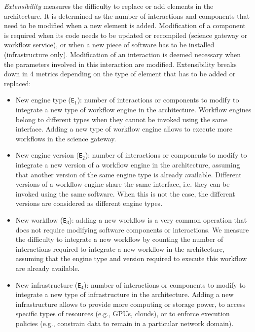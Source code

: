 \documentclass[preprint,3p,twocolumn]{elsarticle}
\newcommand{\todo}[2]{\pdfmargincomment[color=red,author=#1,open=true]{#2}}
\begin{document}
\emph{Extensibility} measures the difficulty to replace or add
elements in the architecture. It is determined as the number of
interactions and components that need to be modified when a new
element is added. Modification of a component is required when its
code needs to be updated or recompiled (science gateway or workflow
service), or when a new piece of software has to be installed
(infrastructure only). Modification of an interaction is deemed
necessary when the parameters involved in this interaction are
modified.  Extensibility breaks down in 4 metrics depending on the
type of element that has to be added or replaced:
\begin{itemize}[leftmargin=0cm,itemindent=0.35cm,itemsep=0cm]
\item New engine type (\texttt{E$_1$}): number of interactions or
  components to modify to integrate a new type of workflow engine in
  the architecture. Workflow engines belong to different types when
  they cannot be invoked using the same interface. Adding a new type
  of workflow engine allows to execute more workflows in the science
  gateway.
\item New engine version (\texttt{E$_2$}): number of interactions or
  components to modify to integrate a new version of a workflow engine
  in the architecture, assuming that another version of the same
  engine type is already available. Different versions of a workflow
  engine share the same interface, i.e. they can be invoked using the
  same software. When this is not the case, the different versions are
  considered as different engine types.
\item New workflow (\texttt{E$_3$}): adding a new workflow is a very
  common operation that does not require modifying software components
  or interactions. We measure the difficulty to integrate a new
  workflow by counting the number of interactions required
  to integrate a new workflow in the architecture, assuming
  that the engine type and version required to execute this workflow
  are already available.
\item New infrastructure (\texttt{E$_4$}): number of interactions or
  components to modify to integrate a new type of infrastructure in
  the architecture. Adding a new infrastructure allows to provide more
  computing or storage power, to access specific types of resources
  (e.g., GPUs, clouds), or to enforce execution policies (e.g.,
  constrain data to remain in a particular network domain). 
\end{itemize}
\end{document}
